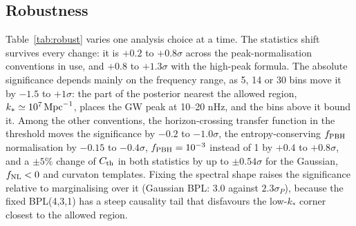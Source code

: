 \documentclass{article}
\newcommand{\fnl}{f_{\rm NL}}
\newcommand{\fpbh}{f_{\rm PBH}}
\begin{document}
\subsection{Robustness}\label{sec:robust}

Table~\ref{tab:robust} varies one analysis choice at a time. The statistics shift survives every
change: it is $+0.2$ to $+0.8\sigma$ across the peak-normalisation conventions in use, and $+0.8$
to $+1.3\sigma$ with the high-peak formula. The absolute significance depends mainly on the
frequency range, as 5, 14 or 30 bins move it by $-1.5$ to $+1\sigma$: the part of the posterior
nearest the allowed region, $k_*\simeq10^7\,{\rm Mpc}^{-1}$, places the GW peak at 10--20 nHz, and
the bins above it bound it. Among the other conventions, the horizon-crossing transfer function in
the threshold moves the significance by $-0.2$ to $-1.0\sigma$, the entropy-conserving $\fpbh$
normalisation by $-0.15$ to $-0.4\sigma$, $\fpbh=10^{-3}$ instead of 1 by $+0.4$ to $+0.8\sigma$,
and a $\pm5\%$ change of $C_{\rm th}$ in both statistics by up to $\pm0.54\sigma$ for the Gaussian,
$\fnl<0$ and curvaton templates. Fixing the spectral shape raises the significance relative to
marginalising over it (Gaussian BPL: $3.0$ against $2.3\sigma_P$), because the fixed BPL(4,3,1)
has a steep causality tail that disfavours the low-$k_*$ corner closest to the allowed region.
\end{document}
